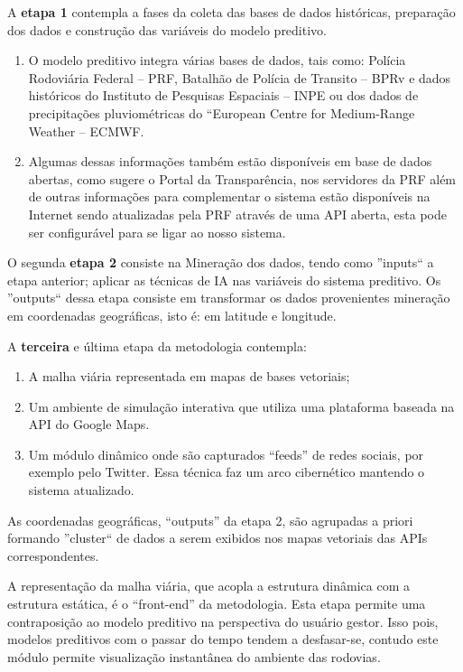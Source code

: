 A \textbf{etapa 1} contempla a fases da coleta das bases de dados históricas, preparação dos dados e construção das variáveis do modelo preditivo.
\begin{enumerate}
 \item O modelo preditivo integra várias bases de dados, tais como: Polícia Rodoviária Federal -- PRF, Batalhão de Polícia de Transito -- BPRv e dados históricos 
       do Instituto de Pesquisas Espaciais -- INPE ou dos dados de precipitações pluviométricas do ``European Centre for Medium-Range Weather -- ECMWF.
 
 \item Algumas dessas informações também estão disponíveis em base de dados abertas, como sugere o Portal da Transparência, nos servidores da PRF além de outras informações para complementar o sistema estão 
       disponíveis na Internet sendo atualizadas pela PRF através de uma API aberta, esta pode ser configurável para se ligar ao nosso sistema.
\end{enumerate}

 
O segunda \textbf{etapa 2} consiste na Mineração dos dados, tendo como ''inputs`` a etapa anterior; aplicar as técnicas de IA nas variáveis do sistema preditivo.
Os ''outputs`` dessa etapa consiste em transformar os dados provenientes mineração em coordenadas geográficas, isto é: em latitude e longitude.  
 
A \textbf{terceira} e última etapa da metodologia contempla:
 \begin{enumerate}
  \item A malha viária representada em mapas de bases vetoriais;
  \item Um ambiente de simulação interativa que utiliza uma plataforma baseada na API do Google Maps.
  \item Um módulo dinâmico onde são capturados ``feeds'' de redes sociais, por exemplo pelo Twitter. 
	Essa técnica faz um arco cibernético mantendo o sistema atualizado.
\end{enumerate}

As coordenadas geográficas, ``outputs'' da etapa 2, são agrupadas a priori formando ''cluster`` de dados 
a serem exibidos nos mapas vetoriais das APIs correspondentes.

A representação da malha viária, que acopla a estrutura dinâmica com a estrutura estática, é o ``front-end'' da metodologia. 
Esta etapa permite uma contraposição ao modelo preditivo na perspectiva do usuário gestor. 
Isso pois, modelos preditivos com o passar do tempo tendem a desfasar-se, contudo este módulo permite visualização
instantânea do ambiente das rodovias. 
 


